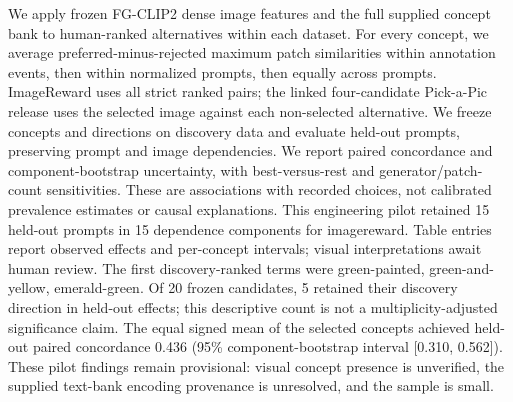 We apply frozen FG-CLIP2 dense image features and the full supplied concept bank to human-ranked alternatives within each dataset. For every concept, we average preferred-minus-rejected maximum patch similarities within annotation events, then within normalized prompts, then equally across prompts. ImageReward uses all strict ranked pairs; the linked four-candidate Pick-a-Pic release uses the selected image against each non-selected alternative. We freeze concepts and directions on discovery data and evaluate held-out prompts, preserving prompt and image dependencies. We report paired concordance and component-bootstrap uncertainty, with best-versus-rest and generator/patch-count sensitivities. These are associations with recorded choices, not calibrated prevalence estimates or causal explanations. This engineering pilot retained 15 held-out prompts in 15 dependence components for imagereward. Table entries report observed effects and per-concept intervals; visual interpretations await human review.
The first discovery-ranked terms were green-painted, green-and-yellow, emerald-green. Of 20 frozen candidates, 5 retained their discovery direction in held-out effects; this descriptive count is not a multiplicity-adjusted significance claim. The equal signed mean of the selected concepts achieved held-out paired concordance 0.436 (95\% component-bootstrap interval [0.310, 0.562]). These pilot findings remain provisional: visual concept presence is unverified, the supplied text-bank encoding provenance is unresolved, and the sample is small.
